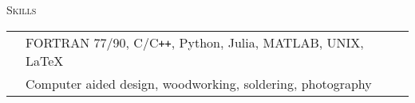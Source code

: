 \documentclass[10pt]{article}
\begin{document}
\vspace{-1.5em}
\begin{multicols}{2}
\textsc{Skills}
\columnbreak

\begin {table}[H]
\begin{tabular}{l l }
\hspace{-0.6em}{Programming} & \hspace{-0.5em} FORTRAN 77/90, C/C\texttt{++}, Python, Julia, MATLAB, UNIX, \LaTeX{}\\
\hspace{-0.6em}{Design     } & \hspace{-0.5em} Computer aided design, woodworking, soldering, photography\\
\end{tabular}	
\end{table}

\end{multicols}
\vspace{-1.5em}
\end{document}
